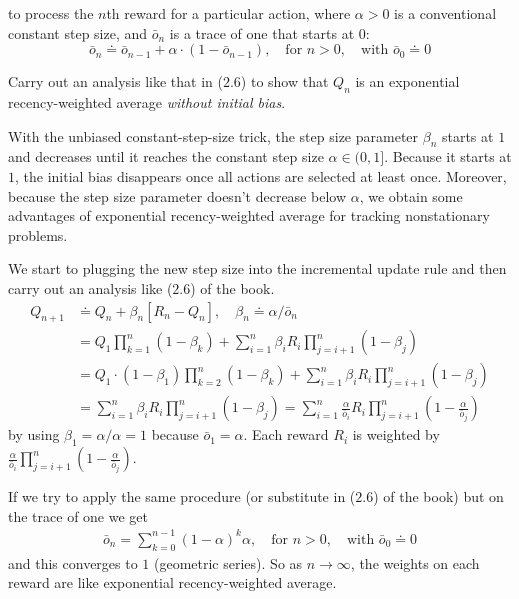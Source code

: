 \documentclass[10pt,a4paper]{article}
\begin{document}
to process the $n$th reward for a particular action, where $\alpha > 0$ is a conventional constant step size, and $\bar{o}_n$ is a trace of one that starts at $0$:
\begin{equation}
\bar{o}_n \doteq \bar{o}_{n-1} + \alpha \cdot (1 - \bar{o}_{n-1}),\quad \textrm{for } n > 0,\quad \textrm{with } \bar{o}_0 \doteq 0
\end{equation}

Carry out an analysis like that in ($2.6$) to show that $Q_n$ is an exponential recency-weighted average \textit{without initial bias}.

\bigskip
With the unbiased constant-step-size trick, the step size parameter $\beta_n$ starts at $1$ and decreases until it reaches the constant step size $\alpha \in (0, 1]$. Because it starts at $1$, the initial bias disappears once all actions are selected at least once. Moreover, because the step size parameter doesn't decrease below $\alpha$, we obtain some advantages of exponential recency-weighted average for tracking nonstationary problems.

We start to plugging the new step size into the incremental update rule and then carry out an analysis like ($2.6$) of the book.
\begin{equation}\label{ex_2_7_incr_update_rule}
\begin{split}
Q_{n+1} &\doteq Q_n + \beta_n [R_n - Q_n],\quad \beta_n \doteq \alpha/\bar{o}_n\\
&=Q_1 \prod_{k=1}^n (1-\beta_k) + \sum_{i=1}^n \beta_i R_i \prod_{j=i+1}^n (1-\beta_j)\\
&=Q_1 \cdot (1 - \beta_1) \prod_{k=2}^n (1-\beta_k) + \sum_{i=1}^n \beta_i R_i \prod_{j=i+1}^n (1-\beta_j)\\
&= \sum_{i=1}^n \beta_i R_i \prod_{j=i+1}^n (1-\beta_j) = \sum_{i=1}^n \frac{\alpha}{\bar{o}_i} R_i \prod_{j=i+1}^n (1-\frac{\alpha}{\bar{o}_j})
\end{split}
\end{equation}
by using $\beta_1 = \alpha/\alpha = 1$ because $\bar{o}_1 = \alpha$. Each reward $R_i$ is weighted by $\frac{\alpha}{\bar{o}_i} \prod_{j=i+1}^n (1-\frac{\alpha}{\bar{o}_j})$.

If we try to apply the same procedure (or substitute in ($2.6$) of the book) but on the trace of one we get
\begin{equation}
\begin{split}
\bar{o}_n = \sum_{k=0}^{n-1} (1-\alpha)^k \alpha,\quad \textrm{for } n > 0,\quad \textrm{with } \bar{o}_0 \doteq 0
\end{split}
\end{equation}
and this converges to $1$ (geometric series). So as $n \to \infty$, the weights on each reward are like exponential recency-weighted average.
\end{document}
